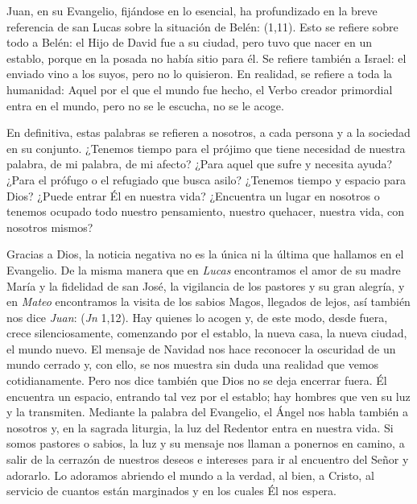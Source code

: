 Juan, en su Evangelio, fijándose en lo esencial, ha profundizado en la breve referencia de san Lucas sobre la situación de Belén:  (1,11). Esto se refiere sobre todo a Belén: el Hijo de David fue a su ciudad, pero tuvo que nacer en un establo, porque en la posada no había sitio para él. Se refiere también a Israel: el enviado vino a los suyos, pero no lo quisieron. En realidad, se refiere a toda la humanidad: Aquel por el que el mundo fue hecho, el Verbo creador primordial entra en el mundo, pero no se le escucha, no se le acoge.

En definitiva, estas palabras se refieren a nosotros, a cada persona y a la sociedad en su conjunto. ¿Tenemos tiempo para el prójimo que tiene necesidad de nuestra palabra, de mi palabra, de mi afecto? ¿Para aquel que sufre y necesita ayuda? ¿Para el prófugo o el refugiado que busca asilo? ¿Tenemos tiempo y espacio para Dios? ¿Puede entrar Él en nuestra vida? ¿Encuentra un lugar en nosotros o tenemos ocupado todo nuestro pensamiento, nuestro quehacer, nuestra vida, con nosotros mismos?

Gracias a Dios, la noticia negativa no es la única ni la última que hallamos en el Evangelio. De la misma manera que en \emph{Lucas} encontramos el amor de su madre María y la fidelidad de san José, la vigilancia de los pastores y su gran alegría, y en \emph{Mateo} encontramos la visita de los sabios Magos, llegados de lejos, así también nos dice \emph{Juan}:  (\emph{Jn} 1,12). Hay quienes lo acogen y, de este modo, desde fuera, crece silenciosamente, comenzando por el establo, la nueva casa, la nueva ciudad, el mundo nuevo. El mensaje de Navidad nos hace reconocer la oscuridad de un mundo cerrado y, con ello, se nos muestra sin duda una realidad que vemos cotidianamente. Pero nos dice también que Dios no se deja encerrar fuera. Él encuentra un espacio, entrando tal vez por el establo; hay hombres que ven su luz y la transmiten. Mediante la palabra del Evangelio, el Ángel nos habla también a nosotros y, en la sagrada liturgia, la luz del Redentor entra en nuestra vida. Si somos pastores o sabios, la luz y su mensaje nos llaman a ponernos en camino, a salir de la cerrazón de nuestros deseos e intereses para ir al encuentro del Señor y adorarlo. Lo adoramos abriendo el mundo a la verdad, al bien, a Cristo, al servicio de cuantos están marginados y en los cuales Él nos espera.

